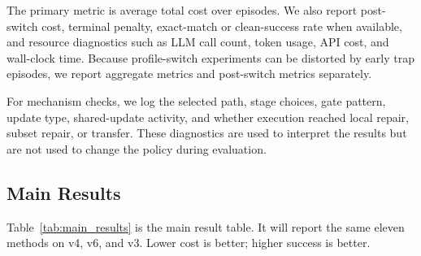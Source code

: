 The primary metric is average total cost over episodes. We also report post-switch cost, terminal penalty, exact-match or clean-success rate when available, and resource diagnostics such as LLM call count, token usage, API cost, and wall-clock time. Because profile-switch experiments can be distorted by early trap episodes, we report aggregate metrics and post-switch metrics separately.

For mechanism checks, we log the selected path, stage choices, gate pattern, update type, shared-update activity, and whether execution reached local repair, subset repair, or transfer. These diagnostics are used to interpret the results but are not used to change the policy during evaluation.

\subsection{Main Results}
\label{sec:exp_main_results}

Table~\ref{tab:main_results} is the main result table. It will report the same eleven methods on v4, v6, and v3. Lower cost is better; higher success is better.

